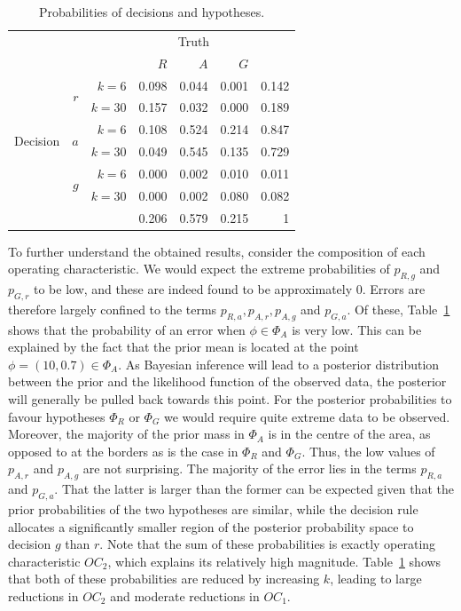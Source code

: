 \documentclass{article} %
\begin{document}
\begin{table}
\centering
\begin{tabular}{r r r r r r r}
\toprule
& & & \multicolumn{3}{c}{Truth} & \\
& & & $R$ & $A$ & $G$ & \\
\midrule
\multirow{6}{*}{Decision} & \multirow{2}{*}{$r$} & $k = 6$ & 0.098 & 0.044 & 0.001 & 0.142 \\\vspace{2mm}
 &  & $k = 30$ & 0.157 & 0.032 & 0.000 & 0.189 \\
 & \multirow{2}{*}{$a$}  & $k = 6$ & 0.108 & 0.524 & 0.214 & 0.847 \\\vspace{2mm}
 &  & $k = 30$ & 0.049 & 0.545 & 0.135 & 0.729 \\
 & \multirow{2}{*}{$g$}  & $k = 6$ & 0.000 & 0.002 & 0.010 & 0.011 \\
 &  & $k = 30$ & 0.000 & 0.002 & 0.080 & 0.082 \\
 \midrule
 & & & 0.206 & 0.579 & 0.215 & 1 \\
\bottomrule
\end{tabular}
\caption{Probabilities of decisions and hypotheses.}
\label{tab:ex_probs}
\end{table}

To further understand the obtained results, consider the composition of each operating characteristic. We would expect the extreme probabilities of $p_{R,g}$ and $p_{G,r}$ to be low, and these are indeed found to be approximately 0. Errors are therefore largely confined to the terms $p_{R,a}, p_{A,r}, p_{A,g}$ and $p_{G,a}$. Of these, Table~\ref{tab:ex_probs} shows that the probability of an error when $\phi \in \Phi_{A}$ is very low. This can be explained by the fact that the prior mean is located at the point $\phi = (10, 0.7) \in \Phi_{A}$. As Bayesian inference will lead to a posterior distribution between the prior and the likelihood function of the observed data, the posterior will generally be pulled back towards this point. For the posterior probabilities to favour hypotheses $\Phi_{R}$ or $\Phi_{G}$ we would require quite extreme data to be observed. Moreover, the majority of the prior mass in $\Phi_{A}$ is in the centre of the area, as opposed to at the borders as is the case in $\Phi_{R}$ and $\Phi_{G}$. Thus, the low values of $p_{A,r}$ and $p_{A,g}$ are not surprising. The majority of the error lies in the terms $p_{R,a}$ and $p_{G,a}$. That the latter is larger than the former can be expected given that the prior probabilities of the two hypotheses are similar, while the decision rule allocates a significantly smaller region of the posterior probability space to decision $g$ than $r$. Note that the sum of these probabilities is exactly operating characteristic $OC_{2}$, which explains its relatively high magnitude. Table~\ref{tab:ex_probs} shows that both of these probabilities are reduced by increasing $k$, leading to large reductions in $OC_{2}$ and moderate reductions in $OC_{1}$.
\end{document}
